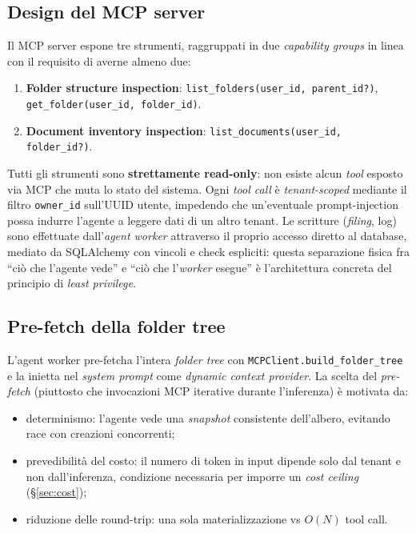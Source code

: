 \documentclass[11pt,a4paper,oneside]{article}
\begin{document}
\subsection{Design del MCP server}
Il MCP server espone tre strumenti, raggruppati in due \emph{capability groups}
in linea con il requisito di averne almeno due:
\begin{enumerate}[leftmargin=*]
    \item \textbf{Folder structure inspection}:
          \texttt{list\_folders(user\_id, parent\_id?)},
          \texttt{get\_folder(user\_id, folder\_id)}.
    \item \textbf{Document inventory inspection}:
          \texttt{list\_documents(user\_id, folder\_id?)}.
\end{enumerate}
Tutti gli strumenti sono \textbf{strettamente read-only}: non esiste alcun
\emph{tool} esposto via MCP che muta lo stato del sistema. Ogni \emph{tool
call} \`e \emph{tenant-scoped} mediante il filtro \texttt{owner\_id} sull'UUID
utente, impedendo che un'eventuale prompt-injection possa indurre l'agente a
leggere dati di un altro tenant. Le scritture (\emph{filing}, log) sono
effettuate dall'\emph{agent worker} attraverso il proprio accesso diretto al
database, mediato da SQLAlchemy con vincoli e check espliciti: questa
separazione fisica fra ``ci\`o che l'agente vede'' e ``ci\`o che
l'\emph{worker} esegue'' \`e l'architettura concreta del principio di
\emph{least privilege}.

\subsection{Pre-fetch della folder tree}
L'agent worker pre-fetcha l'intera \emph{folder tree} con
\texttt{MCPClient.build\_folder\_tree} e la inietta nel \emph{system prompt}
come \emph{dynamic context provider}. La scelta del \emph{pre-fetch}
(piuttosto che invocazioni MCP iterative durante l'inferenza) \`e motivata
da:
\begin{itemize}[leftmargin=*]
    \item determinismo: l'agente vede una \emph{snapshot} consistente
          dell'albero, evitando race con creazioni concorrenti;
    \item prevedibilit\`a del costo: il numero di token in input dipende solo
          dal tenant e non dall'inferenza, condizione necessaria per imporre
          un \emph{cost ceiling} (\S\ref{sec:cost});
    \item riduzione delle round-trip: una sola materializzazione vs $O(N)$
          tool call.
\end{itemize}
\end{document}
